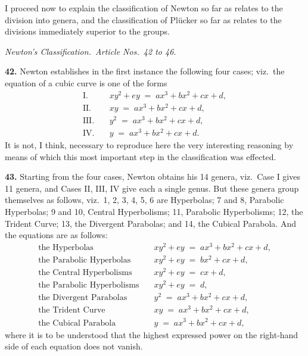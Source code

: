 \documentclass[11pt,a4paper]{article}
\begin{document}
I proceed now to explain the classification of Newton so far as relates to the division into genera, and the classification of Pl\"ucker so far as relates to the divisions immediately superior to the groups.

\medskip

\noindent\textit{Newton's Classification.\ Article Nos.\ 42 to 46.}

\medskip

\textbf{42.} Newton establishes in the first instance the following four cases; viz.\ the equation of a cubic curve is one of the forms
\begin{align*}
\text{I.}\quad& xy^{2}+ey \;=\; ax^{3}+bx^{2}+cx+d,\\
\text{II.}\quad& xy \;=\; ax^{3}+bx^{2}+cx+d,\\
\text{III.}\quad& y^{2} \;=\; ax^{3}+bx^{2}+cx+d,\\
\text{IV.}\quad& y \;=\; ax^{3}+bx^{2}+cx+d.
\end{align*}
It is not, I think, necessary to reproduce here the very interesting reasoning by means of which this most important step in the classification was effected.

\medskip

\textbf{43.} Starting from the four cases, Newton obtains his 14 genera, viz.\ Case I gives 11 genera, and Cases II, III, IV give each a single genus. But these genera group themselves as follows, viz.\ 1, 2, 3, 4, 5, 6 are Hyperbolas; 7 and 8, Parabolic Hyperbolas; 9 and 10, Central Hyperbolisms; 11, Parabolic Hyperbolisms; 12, the Trident Curve; 13, the Divergent Parabolas; and 14, the Cubical Parabola. And the equations are as follows:
\begin{align*}
\text{the Hyperbolas}\quad& xy^{2} + ey \;=\; ax^{3}+bx^{2}+cx+d,\\
\text{the Parabolic Hyperbolas}\quad& xy^{2} + ey \;=\; bx^{2}+cx+d,\\
\text{the Central Hyperbolisms}\quad& xy^{2} + ey \;=\; cx+d,\\
\text{the Parabolic Hyperbolisms}\quad& xy^{2} + ey \;=\; d,\\
\text{the Divergent Parabolas}\quad& y^{2} \;=\; ax^{3}+bx^{2}+cx+d,\\
\text{the Trident Curve}\quad& xy \;=\; ax^{3}+bx^{2}+cx+d,\\
\text{the Cubical Parabola}\quad& y \;=\; ax^{3}+bx^{2}+cx+d,
\end{align*}
where it is to be understood that the highest expressed power on the right-hand side of each equation does not vanish.
\end{document}

